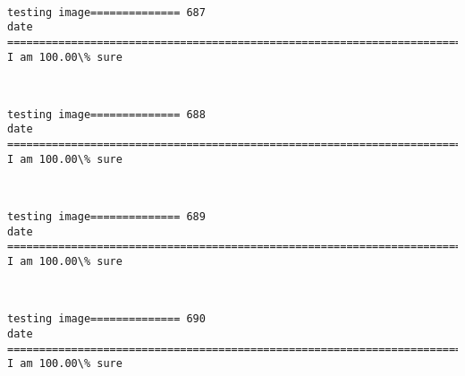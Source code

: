 \documentclass[11pt]{article}
\begin{document}
    \begin{center}
    \end{center}
    { \hspace*{\fill} \\}
    
    \begin{Verbatim}[commandchars=\\\{\}]
testing image============== 687
date
============================================================================
I am 100.00\% sure

    \end{Verbatim}

    \begin{center}
    \end{center}
    { \hspace*{\fill} \\}
    
    \begin{Verbatim}[commandchars=\\\{\}]
testing image============== 688
date
============================================================================
I am 100.00\% sure

    \end{Verbatim}

    \begin{center}
    \end{center}
    { \hspace*{\fill} \\}
    
    \begin{Verbatim}[commandchars=\\\{\}]
testing image============== 689
date
============================================================================
I am 100.00\% sure

    \end{Verbatim}

    \begin{center}
    \end{center}
    { \hspace*{\fill} \\}
    
    \begin{Verbatim}[commandchars=\\\{\}]
testing image============== 690
date
============================================================================
I am 100.00\% sure

    \end{Verbatim}
\end{document}
